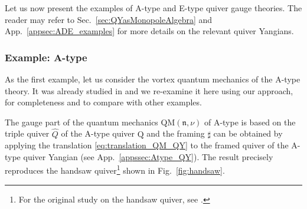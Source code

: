 \documentclass[12pt,a4paper]{article}
\newcommand{\nn}{\mathfrak{n}}
\renewcommand{\(}{\left(}
\renewcommand{\)}{\right)}
\renewcommand{\(}{\left(}
\renewcommand{\)}{\right)}
\begin{document}
\medskip

Let us now present the examples of A-type and E-type quiver gauge theories. 
The reader may refer to Sec.~\ref{sec:QYasMonopoleAlgebra} and App.~\ref{appsec:ADE_examples} for more details on the relevant quiver Yangians.


\subsubsection{Example: A-type}
As the first example, let us consider the vortex quantum mechanics of the A-type theory.
It was already studied in \cite{Bullimore:2016hdc} and we re-examine it here using our approach, for completeness and to compare with other examples. 


The gauge part of the quantum mechanics QM$(\nn,\nu)$ of A-type is based on the triple quiver $\widehat{Q}$ of the A-type quiver $\mathrm{Q}$ and the framing $\sharp$ can be obtained by applying the translation \eqref{eq:translation_QM_QY} to the framed quiver of the A-type quiver Yangian (see App.~\ref{appssec:Atype_QY}). 
The result precisely reproduces the handsaw quiver\footnote{For the original study on the handsaw quiver, see \cite{Nakajima:2011yq}.} shown in Fig.~\ref{fig:handsaw}. 
\end{document}
